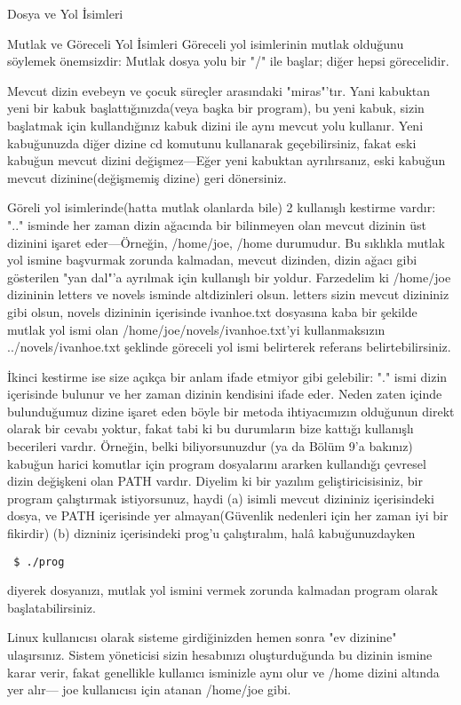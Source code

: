 \documentclass[10pt,a5paper]{book}
\begin{document}
\begin{section}{Dosya ve Yol İsimleri}
\begin{subsection}{Mutlak ve Göreceli Yol İsimleri}
	Göreceli yol isimlerinin mutlak olduğunu söylemek önemsizdir: Mutlak dosya yolu bir "/" ile başlar; diğer hepsi görecelidir.
	
	Mevcut dizin evebeyn ve çocuk süreçler arasındaki "miras"'tır. Yani kabuktan yeni bir kabuk başlattığınızda(veya başka bir program), bu yeni kabuk, sizin başlatmak için kullandığınız kabuk dizini ile aynı mevcut yolu kullanır. Yeni kabuğunuzda diğer dizine cd komutunu kullanarak geçebilirsiniz, fakat eski kabuğun mevcut dizini değişmez—Eğer yeni kabuktan ayrılırsanız, eski kabuğun mevcut dizinine(değişmemiş dizine) geri dönersiniz. 
	
	Göreli yol isimlerinde(hatta mutlak olanlarda bile) 2 kullanışlı kestirme vardır: ".." isminde her zaman dizin ağacında bir bilinmeyen olan mevcut dizinin üst dizinini işaret eder—Örneğin, /home/joe, /home durumudur. Bu sıklıkla mutlak yol ismine başvurmak zorunda kalmadan, mevcut dizinden, dizin ağacı gibi gösterilen "yan dal"'a ayrılmak için kullanışlı bir yoldur. Farzedelim ki /home/joe dizininin letters ve novels isminde altdizinleri olsun. letters sizin mevcut dizininiz gibi olsun, novels dizininin içerisinde ivanhoe.txt dosyasına kaba bir şekilde mutlak yol ismi olan /home/joe/novels/ivanhoe.txt'yi kullanmaksızın ../novels/ivanhoe.txt şeklinde göreceli yol ismi belirterek referans belirtebilirsiniz.
	
	İkinci kestirme ise size açıkça bir anlam ifade etmiyor gibi gelebilir: "." ismi dizin içerisinde bulunur ve her zaman dizinin kendisini ifade eder. Neden zaten içinde bulunduğumuz dizine işaret eden böyle bir metoda ihtiyacımızın olduğunun direkt olarak bir cevabı yoktur, fakat  tabi ki bu durumların bize kattığı kullanışlı becerileri vardır. Örneğin, belki biliyorsunuzdur (ya da Bölüm 9'a bakınız) kabuğun harici komutlar için program dosyalarını ararken kullandığı çevresel dizin değişkeni olan PATH vardır. Diyelim ki bir yazılım geliştiricisisiniz, bir program çalıştırmak istiyorsunuz, haydi (a) isimli mevcut dizininiz içerisindeki dosya, ve PATH içerisinde yer almayan(Güvenlik nedenleri için her zaman iyi bir fikirdir) (b) dizniniz içerisindeki prog'u çalıştıralım, halâ kabuğunuzdayken
\begin{verbatim}
 $ ./prog
\end{verbatim} 
diyerek dosyanızı, mutlak yol ismini vermek zorunda kalmadan program olarak başlatabilirsiniz.

Linux kullanıcısı olarak sisteme girdiğinizden hemen sonra "ev dizinine" ulaşırsınız. Sistem yöneticisi sizin hesabınızı oluşturduğunda bu dizinin ismine karar verir, fakat genellikle kullanıcı isminizle aynı olur ve /home dizini altında yer alır— joe kullanıcısı için atanan /home/joe gibi.

\end{subsection}
\end{section}
\end{document}
